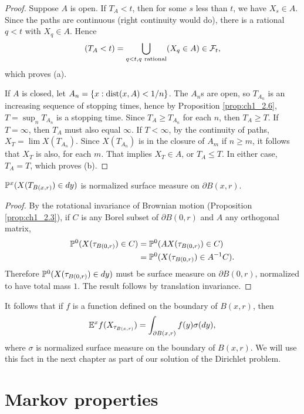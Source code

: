 \begin{proof}
Suppose $A$ is open. If $T_A < t$, then for some $s$ less than $t$, we have $X_s \in A$. Since the paths are continuous (right continuity would do), there is a rational $q < t$ with $X_q \in A$. Hence
\[
    (T_A < t) = \bigcup_{q<t,q~\text{rational}} (X_q \in A) \in \FC_t,
\]
which proves (a).

If $A$ is closed, let $A_n = \{x : \dist(x,A) < 1/n\}$. The $A_n$s are open, so $T_{A_n}$ is an increasing sequence of stopping times, hence by Proposition \ref{prop:ch1_2.6}, $T = \sup_n T_{A_n}$ is a stopping time. Since $T_A \geq T_{A_n}$ for each $n$, then $T_A \geq T$. If $T = \infty$, then $T_A$ must also equal $\infty$. If $T < \infty$, by the continuity of paths, $X_T = \lim X(T_{A_n})$. Since $X(T_{A_n})$ is in the closure of $A_m$ if $n \geq m$, it follows that $X_T$ is also, for each $m$. That implies $X_T \in A$, or $T_A \leq T$. In either case, $T_A = T$, which proves (b).
\end{proof}

\begin{proposition}\label{prop:ch1_2.8}
$\P^x(X(T_{B(x,r)}) \in dy)$ is normalized surface measure on $\partial B(x,r)$.
\end{proposition}

\begin{proof}
By the rotational invariance of Brownian motion (Proposition \ref{prop:ch1_2.3}), if $C$ is any Borel subset of $\partial B(0,r)$ and $A$ any orthogonal matrix,
\begin{align*}
    \P^0(X(\tau_{B(0,r)}) \in C) &= \P^0(AX(\tau_{B(0,r)}) \in C) \\
    &= \P^0(X(\tau_{B(0,r)}) \in A^{-1}C).
\end{align*}
\mnewpage
Therefore $\P^0(X(\tau_{B(0,r)}) \in dy)$ must be surface measure on $\partial B(0,r)$, normalized to have total mass $1$. The result follows by translation invariance.
\end{proof}

It follows that if $f$ is a function defined on the boundary of $B(x,r)$, then
\[
    \E^x f(X_{\tau_{B(x,r)}}) = \int_{\partial B(x,r)} f(y)\sigma(dy),
\]
where $\sigma$ is normalized surface measure on the boundary of $B(x,r)$. We will use this fact in the next chapter as part of our solution of the Dirichlet problem.

\section{Markov properties}\label{ch1_sec3}

